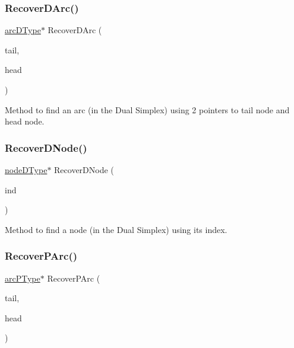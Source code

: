 \subsubsection{\texorpdfstring{Recover\+D\+Arc()}{RecoverDArc()}}
{\footnotesize\ttfamily \mbox{\hyperlink{struct_m_c_f_simplex_1_1arc_d_type}{arc\+D\+Type}}$\ast$ Recover\+D\+Arc (\begin{DoxyParamCaption}\item[{\mbox{\hyperlink{struct_m_c_f_simplex_1_1node_d_type}{node\+D\+Type}} $\ast$}]{tail,  }\item[{\mbox{\hyperlink{struct_m_c_f_simplex_1_1node_d_type}{node\+D\+Type}} $\ast$}]{head }\end{DoxyParamCaption})\hspace{0.3cm}{\ttfamily [private]}}

Method to find an arc (in the Dual Simplex) using 2 pointers to tail node and head node. \mbox{\label{class_m_c_f_simplex_ad45095829e1ad1e222240c64cf7780ee}} 
\subsubsection{\texorpdfstring{Recover\+D\+Node()}{RecoverDNode()}}
{\footnotesize\ttfamily \mbox{\hyperlink{struct_m_c_f_simplex_1_1node_d_type}{node\+D\+Type}}$\ast$ Recover\+D\+Node (\begin{DoxyParamCaption}\item[{\mbox{\hyperlink{class_m_c_f_class_ad53d6229d7ec28555a9c9c2fd9abf773}{Index}}}]{ind }\end{DoxyParamCaption})\hspace{0.3cm}{\ttfamily [private]}}

Method to find a node (in the Dual Simplex) using its index. \mbox{\label{class_m_c_f_simplex_a16406161e6cc93f61f6a20edbbe0bc75}} 
\subsubsection{\texorpdfstring{Recover\+P\+Arc()}{RecoverPArc()}}
{\footnotesize\ttfamily \mbox{\hyperlink{struct_m_c_f_simplex_1_1arc_p_type}{arc\+P\+Type}}$\ast$ Recover\+P\+Arc (\begin{DoxyParamCaption}\item[{\mbox{\hyperlink{struct_m_c_f_simplex_1_1node_p_type}{node\+P\+Type}} $\ast$}]{tail,  }\item[{\mbox{\hyperlink{struct_m_c_f_simplex_1_1node_p_type}{node\+P\+Type}} $\ast$}]{head }\end{DoxyParamCaption})\hspace{0.3cm}{\ttfamily [private]}}

